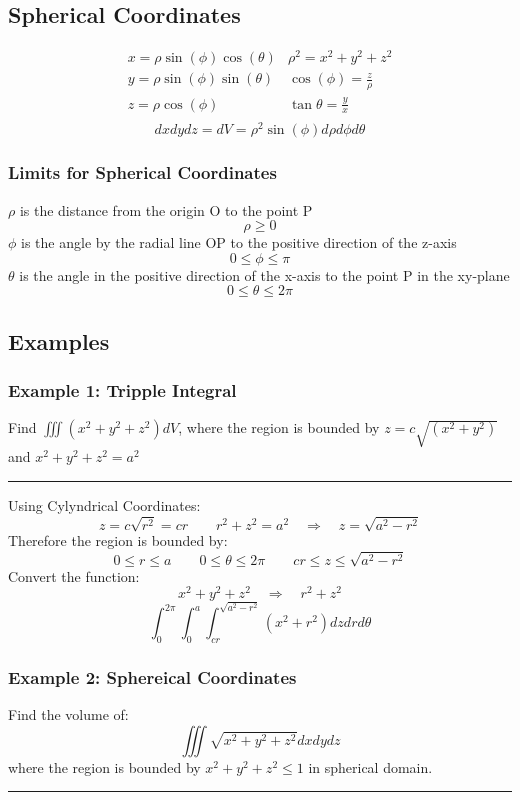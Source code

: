 \subsection{Spherical Coordinates}
$$\begin{array}{ll}
  x=\rho \sin(\phi) \cos(\theta)&\rho^2=x^2+y^2+z^2\\       
  y=\rho \sin(\phi) \sin(\theta)&\cos(\phi)=\frac{z}{\rho}\\
  z=\rho \cos(\phi)&             \tan \theta=\frac{y}{x}\\  
\end{array}$$
$$dx dydz=dV=\rho^{2}\sin(\phi)d\rho d\phi d\theta$$
\subsubsection{Limits for Spherical Coordinates}
$\rho$ is the distance from the origin O to the point P
$$\rho \geq 0$$
$\phi$ is the angle by the radial line OP to the positive direction of the z-axis
$$0\leq \phi \leq \pi$$
$\theta$ is the angle in the positive direction of the x-axis to the point P in the xy-plane
$$0\leq\theta \leq 2\pi$$

\subsection{Examples}
\subsubsection{Example 1: Tripple Integral}
Find $\iiint(x^{2}+y^{2}+z^{2})d V$, where the region is bounded by
$z=c\sqrt{(x^{2}+y^{2})}$ and $x^{2}+y^{2}+z^{2}=a^{2}$

\rule{\textwidth}{0.5pt}

Using Cylyndrical Coordinates:
$$z=c\sqrt{r^2}=cr\qquad r^2+z^2=a^2\quad\Rightarrow\quad z=\sqrt{a^2-r^2}$$
Therefore the region is bounded by:
$$0\leq r\leq a\qquad 0\leq\theta\leq 2\pi\qquad cr\leq z\leq\sqrt{a^2-r^2}$$
Convert the function:
$$x^2+y^2+z^2\quad\Rightarrow\quad r^2+z^2$$
$$\int_0^{2\pi}\int_0^a\int_{cr}^{\sqrt{a^2-r^2}}(x^2+r^2)dzdrd\theta$$
\subsubsection{Example 2: Sphereical Coordinates}
Find the volume of:
$$\iiint\sqrt{x^2+y^2+z^2}dxdydz$$
where the region is bounded by $x^2+y^2+z^2\leq1$ in spherical domain.

\rule{\textwidth}{0.5pt}

